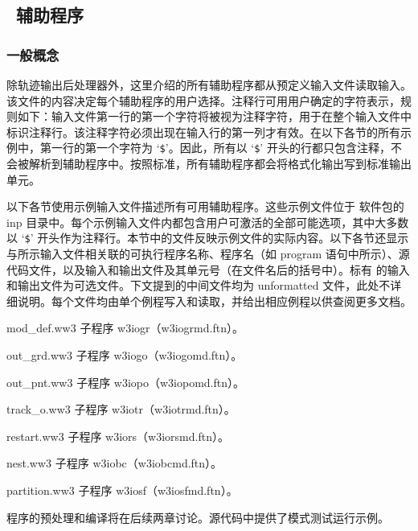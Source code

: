 \vssub
\subsection{~辅助程序} \label{sec:auxprog}

\vsssub
\subsubsection{一般概念}
\vsssub

除轨迹输出后处理器外，这里介绍的所有辅助程序都从预定义输入文件读取输入。该文件的内容决定每个辅助程序的用户选择。注释行可用用户确定的字符表示，规则如下：输入文件第一行的第一个字符将被视为注释字符，用于在整个输入文件中标识注释行。该注释字符必须出现在输入行的第一列才有效。在以下各节的所有示例中，第一行的第一个字符为 `{\tt \$}'。因此，所有以 `{\tt \$}' 开头的行都只包含注释，不会被解析到辅助程序中。按照标准，所有辅助程序都会将格式化输出写到标准输出单元。

以下各节使用示例输入文件描述所有可用辅助程序。这些示例文件位于 \ws{} 软件包的 {\code inp} 目录中。每个示例输入文件内都包含用户可激活的全部可能选项，其中大多数以 `{\tt \$}' 开头作为注释行。本节中的文件反映示例文件的实际内容。以下各节还显示与所示输入文件相关联的可执行程序名称、程序名（如 program 语句中所示）、源代码文件，以及输入和输出文件及其单元号（在文件名后的括号中）。标有 \opt{} 的输入和输出文件为可选文件。下文提到的中间文件均为 {\F unformatted} 文件，此处不详细说明。每个文件均由单个例程写入和读取，并给出相应例程以供查阅更多文档。

\begin{list}{}{\itemsep 0mm \parsep 0mm \leftmargin 40mm }
\item[{mod\_def.ww3} \hfill] 子程序 {\F w3iogr}（{\file w3iogrmd.ftn}）。
\item[{out\_grd.ww3} \hfill] 子程序 {\F w3iogo}（{\file w3iogomd.ftn}）。
\item[{out\_pnt.ww3} \hfill] 子程序 {\F w3iopo}（{\file w3iopomd.ftn}）。
\item[{track\_o.ww3} \hfill] 子程序 {\F w3iotr}（{\file w3iotrmd.ftn}）。
\item[{restart.ww3}  \hfill] 子程序 {\F w3iors}（{\file w3iorsmd.ftn}）。
\item[{nest.ww3}     \hfill] 子程序 {\F w3iobc}（{\file w3iobcmd.ftn}）。
\item[{partition.ww3}\hfill] 子程序 {\F w3iosf}（{\file w3iosfmd.ftn}）。
\end{list}

\noindent
程序的预处理和编译将在后续两章讨论。源代码中提供了模式测试运行示例。

